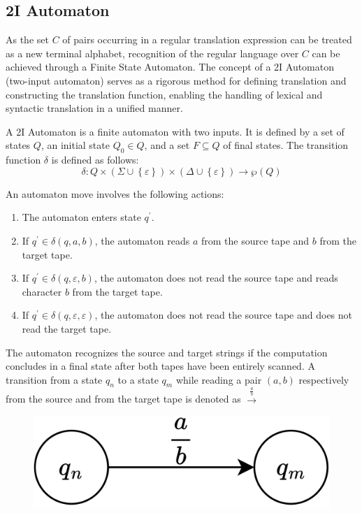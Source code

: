 \subsection{2I Automaton}
As the set $C$ of pairs occurring in a regular translation expression can be treated as a new terminal alphabet, recognition of the regular language over $C$ can be achieved through a Finite State Automaton.
The concept of a 2I Automaton (two-input automaton) serves as a rigorous method for defining translation and constructing the translation function, enabling the handling of lexical and syntactic translation in a unified manner.
\begin{definition}[2I Automaton]
    A 2I Automaton is a finite automaton with two inputs.
    It is defined by a set of states $Q$, an initial state $Q_0 \in Q$, and a set $F \subseteq Q$ of final states. 
    The transition function $\delta$ is defined as follows:
    \[ \delta : Q \times \left( \Sigma \cup \left\{ \varepsilon \right\} \right) \times \left( \Delta \cup \left\{ \varepsilon \right\} \right) \rightarrow \wp (Q) \]
\end{definition}
An automaton move involves the following actions:
\begin{enumerate}
    \item The automaton enters state $q^{'}$.
    \item If $q^{'} \in \delta(q, a, b)$, the automaton reads $a$ from the source tape and $b$ from the target tape. 
    \item If $q^{'} \in \delta(q, \varepsilon, b)$, the automaton does not read the source tape and reads character $b$ from the target tape. 
    \item If $q^{'} \in \delta(q, \varepsilon,\varepsilon)$, the automaton does not read the source tape and does not read the target tape. 
\end{enumerate}
The automaton recognizes the source and target strings if the computation concludes in a final state after both tapes have been entirely scanned. 
A transition from a state $q_n$ to a state $q_m$ while reading a pair $\left( a, b \right)$ respectively from the source and from the target tape is denoted as $\xrightarrow{\frac{a}{b}}$
\begin{figure}[H]
  \centering
  \includegraphics[width=0.5\linewidth]{images/2i.png}
\end{figure}

